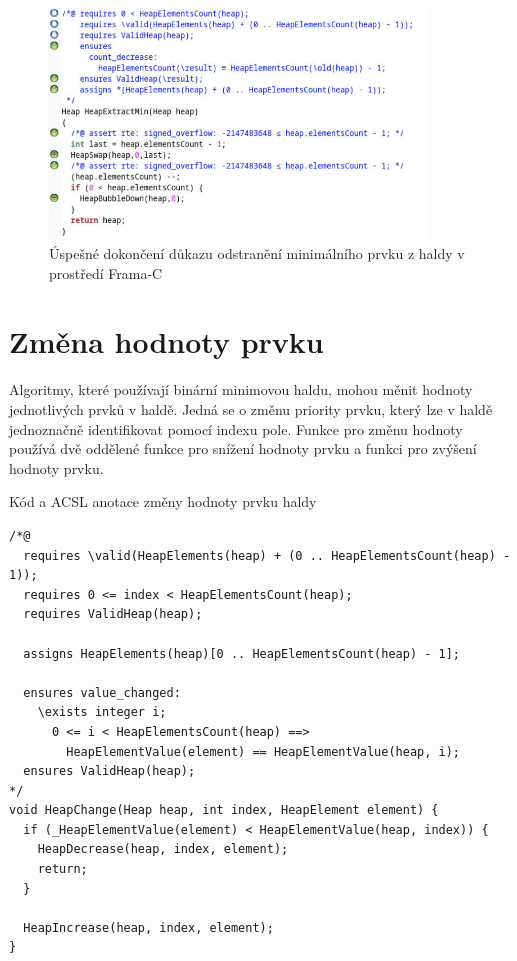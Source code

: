 \begin{figure}[H]
	\centering
	\includegraphics[width=10cm]{images/frama-c-HeapExtractMin}
	\caption{Úspešné dokončení důkazu odstranění minimálního prvku z haldy v prostředí Frama-C}
	\label{img:F-C-HeapExtractMin}
\end{figure}


\section{Změna hodnoty prvku}
\label{subsec:HeapChange}

Algoritmy, které používají binární minimovou haldu, mohou měnit hodnoty jednotlivých prvků v haldě. Jedná se o změnu priority prvku, který lze v haldě jednoznačně identifikovat pomocí indexu pole. Funkce pro změnu hodnoty používá dvě oddělené funkce pro snížení hodnoty prvku a funkci pro zvýšení hodnoty prvku.

\begin{listing}[H]
	\caption{Kód a ACSL anotace změny hodnoty prvku haldy}
	\label{code:HeapChange}
	\begin{verbatim}
/*@
  requires \valid(HeapElements(heap) + (0 .. HeapElementsCount(heap) - 1));
  requires 0 <= index < HeapElementsCount(heap);
  requires ValidHeap(heap);

  assigns HeapElements(heap)[0 .. HeapElementsCount(heap) - 1];

  ensures value_changed:
    \exists integer i;
      0 <= i < HeapElementsCount(heap) ==>
        HeapElementValue(element) == HeapElementValue(heap, i);
  ensures ValidHeap(heap);
*/
void HeapChange(Heap heap, int index, HeapElement element) {
  if (_HeapElementValue(element) < HeapElementValue(heap, index)) {
    HeapDecrease(heap, index, element);
    return;
  }

  HeapIncrease(heap, index, element);
}
	\end{verbatim}
\end{listing}

